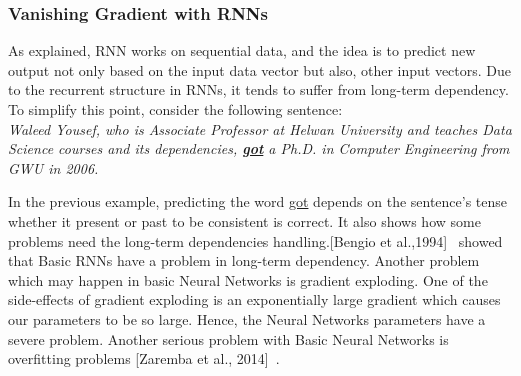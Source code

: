  \subsubsection{Vanishing Gradient with RNNs}\label{Sec:RNN_Vanishing}
 
As explained, RNN works on sequential data, and the idea is to predict new output not only based on the input data vector but also, other input vectors. Due to the recurrent structure in RNNs, it tends to suffer from long-term dependency. To simplify this point, consider the following sentence:\\
\textit{Waleed Yousef, who is Associate Professor at Helwan University and teaches Data Science courses and its dependencies, \textbf{\underline{got}} a Ph.D. in Computer Engineering from GWU in 2006.}

In the previous example, predicting the word \underline{got} depends on the sentence’s tense whether it present or past to be consistent is correct. It also shows how some problems need the long-term dependencies handling.[Bengio et al.,1994]~\cite{Bengio_1994} showed that Basic RNNs have a problem in long-term dependency.  Another problem which may happen in basic Neural Networks is gradient exploding. One of the side-effects of gradient exploding is an exponentially large gradient which causes our parameters to be so large. Hence, the Neural Networks parameters have a severe problem. Another serious problem with Basic Neural Networks is overfitting problems [Zaremba et al., 2014]~\cite{Zaremba_et_al}.

